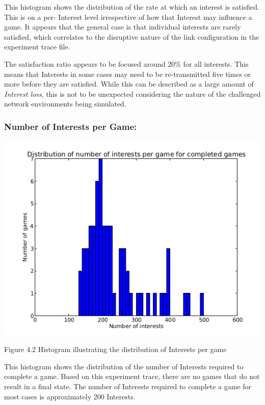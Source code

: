 \documentclass[a4paper,12pt]{report}      %
\begin{document}
\begin{descripton}
This histogram shows the distribution of the rate at which an interest is satisfied. This is on a per-
Interest level irrespective of how that Interest may influence a game. It appears that the general case is
that individual interests are rarely satisfied, which correlates to the disruptive nature of the link
configuration in the experiment trace file.

The satisfaction ratio appears to be focused around 20\% for all interests. This means that Interests in some cases may 
need to be re-transmitted five times or more before they are satisfied. While this can be described as a large 
amount of \emph{Interest loss}, this is not to be unexpected considering the nature of the challenged network
 environments being simulated.

\subsubsection{Number of Interests per Game:}

\includegraphics[scale=0.73]{InterestsPerGameHist.jpg}

\begin{center}Figure 4.2 Histogram illustrating the distribution of Interests per game\end{center}

This histogram shows the distribution of the number of Interests required to complete a game. 
Based on this experiment trace, there are no games that do not result in a final state.
The number of Interests required to complete a game for most cases is approximately 200 Interests. 


\end{descripton}
\end{document}
